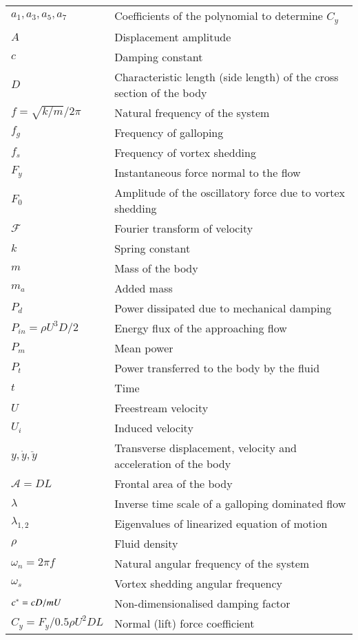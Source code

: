 \begin{longtable}{p{}p{}}
$a_1,a_3,a_5,a_7$ & Coefficients of the polynomial to determine $C_y$ \\ 
$A$ & Displacement amplitude\\
$c$ & Damping constant \\
$D$ & Characteristic length (side length) of the cross section of the body \\
$f=\sqrt{k/m}/2\pi$ & Natural frequency of the system \\
$f_g$ & Frequency of galloping \\
$f_s$ & Frequency of vortex shedding \\
$F_y$ & Instantaneous force normal to the flow \\ 
$F_0$& Amplitude of the oscillatory force due to vortex shedding \\
$\mathcal{F}$&  Fourier transform of velocity \\
$k$ & Spring constant \\
$m$ & Mass of the body \\
$m_a$ & Added mass \\
$P_d$ & Power dissipated due to mechanical damping  \\
$P_{in}=\rho U^3D/2$ & Energy flux of the approaching flow \\
$P_{m}$ & Mean power \\
$P_t$   & Power transferred to the body by the fluid \\
$t$ & Time \\
$U$ & Freestream velocity \\
$U_i$ & Induced velocity \\
$y,\dot{y},\ddot{y}$ & Transverse displacement, velocity and acceleration of the body \\
$\mathcal{A}=DL$ & Frontal area of the body\\ 
$\lambda$ & Inverse time scale of a galloping dominated flow \\
$\lambda_{1,2}$ & Eigenvalues of linearized equation of motion \\
$\rho$ & Fluid density  \\
$\omega_n= 2 \pi f$ & Natural angular frequency of the system  \\
$\omega_s$ & Vortex shedding angular frequency \\
$c^{*}=cD/mU$ & Non-dimensionalised damping factor \\
$C_y=F_y/0.5\rho U^2DL$ & Normal (lift) force coefficient \\

\end{longtable}
